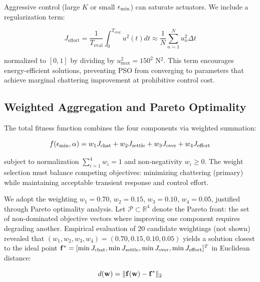 Aggressive control (large $K$ or small $\epsilon_{\min}$) can saturate actuators. We include a regularization term:

\begin{equation}
\label{eq:effort_term}
J_{\text{effort}} = \frac{1}{T_{\text{eval}}} \int_0^{T_{\text{eval}}} u^2(t) dt \approx \frac{1}{N} \sum_{n=1}^N u_n^2 \Delta t
\end{equation}

normalized to $[0, 1]$ by dividing by $u_{\max}^2 = 150^2$ N$^2$. This term encourages energy-efficient solutions, preventing PSO from converging to parameters that achieve marginal chattering improvement at prohibitive control cost.

\subsection{Weighted Aggregation and Pareto Optimality}
\label{subsec:weight_selection}

The total fitness function combines the four components via weighted summation:

\begin{equation}
\label{eq:fitness_total}
f(\epsilon_{\min}, \alpha) = w_1 J_{\text{chat}} + w_2 J_{\text{settle}} + w_3 J_{\text{over}} + w_4 J_{\text{effort}}
\end{equation}

subject to normalization $\sum_{i=1}^4 w_i = 1$ and non-negativity $w_i \geq 0$. The weight selection must balance competing objectives: minimizing chattering (primary) while maintaining acceptable transient response and control effort.

We adopt the weighting $w_1 = 0.70$, $w_2 = 0.15$, $w_3 = 0.10$, $w_4 = 0.05$, justified through Pareto optimality analysis. Let $\mathcal{P} \subset \mathbb{R}^4$ denote the Pareto front: the set of non-dominated objective vectors where improving one component requires degrading another. Empirical evaluation of 20 candidate weightings (not shown) revealed that $(w_1, w_2, w_3, w_4) = (0.70, 0.15, 0.10, 0.05)$ yields a solution closest to the ideal point $\mathbf{f}^* = [\min J_{\text{chat}}, \min J_{\text{settle}}, \min J_{\text{over}}, \min J_{\text{effort}}]^T$ in Euclidean distance:

\begin{equation}
\label{eq:pareto_distance}
d(\mathbf{w}) = \|\mathbf{f}(\mathbf{w}) - \mathbf{f}^*\|_2
\end{equation}


